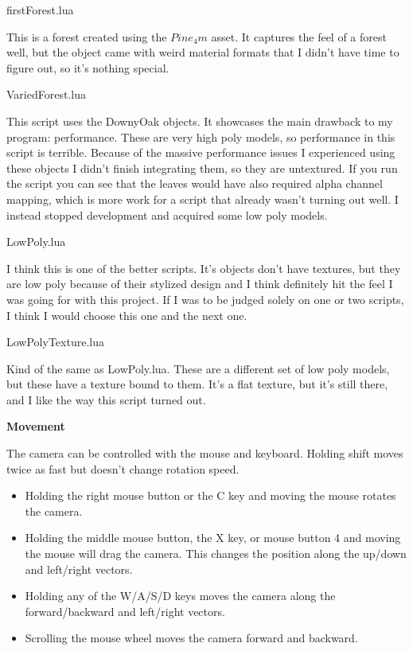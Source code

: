 \documentclass[10pt]{article}
\begin{document}
	\begin{center}
		firstForest.lua
	\end{center}
	
	This is a forest created using the $Pine_4m$ asset. It captures the feel of a forest well, but the object came with weird material formats that I didn't have time to figure out, so it's nothing special.
	
	\begin{center}
		VariedForest.lua
	\end{center}
	
	This script uses the DownyOak objects. It showcases the main drawback to my program: performance. These are very high poly models, so performance in this script is terrible. Because of the massive performance issues I experienced using these objects I didn't finish integrating them, so they are untextured. If you run the script you can see that the leaves would have also required alpha channel mapping, which is more work for a script that already wasn't turning out well. I instead stopped development and acquired some low poly models.
	
	\begin{center}
		LowPoly.lua
	\end{center}
	
	I think this is one of the better scripts. It's objects don't have textures, but they are low poly because of their stylized design and I think definitely hit the feel I was going for with this project. If I was to be judged solely on one or two scripts, I think I would choose this one and the next one.
	
	\begin{center}
		LowPolyTexture.lua
	\end{center}
	
	Kind of the same as LowPoly.lua. These are a different set of low poly models, but these have a texture bound to them. It's a flat texture, but it's still there, and I like the way this script turned out.
	
	\begin{center}
		\bf Movement
	\end{center}
	The camera can be controlled with the mouse and keyboard. Holding shift moves twice as fast but doesn't change rotation speed.
	
	\begin{itemize}
		\item Holding the right mouse button or the C key and moving the mouse rotates the camera.
		\item Holding the middle mouse button, the X key, or mouse button 4 and moving the mouse will drag the camera. This changes the position along the up/down and left/right vectors.
		\item Holding any of the W/A/S/D keys moves the camera along the forward/backward and left/right vectors.
		\item Scrolling the mouse wheel moves the camera forward and backward.
	\end{itemize}
	
\end{document}

